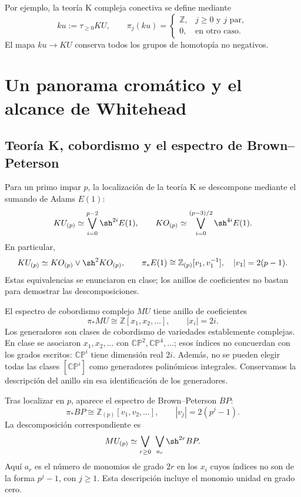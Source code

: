 Por ejemplo, la teoría K compleja conectiva se define mediante
\[
ku:=\tau_{\geq0}KU,
\qquad
\pi_j(ku)=
\begin{cases}
\mathbb Z,&j\geq0\text{ y }j\text{ par},\\
0,&\text{en otro caso}.
\end{cases}
\]
El mapa $ku\to KU$ conserva todos los grupos de homotopía no negativos.

\section{Un panorama cromático y el alcance de Whitehead}

\subsection{Teoría K, cobordismo y el espectro de Brown--Peterson}
Para un primo impar $p$, la localización de la teoría K se descompone mediante el sumando de Adams $E(1)$:
\[
KU_{(p)}\simeq\bigvee_{i=0}^{p-2}\sh^{2i}E(1),
\qquad
KO_{(p)}\simeq\bigvee_{i=0}^{(p-3)/2}\sh^{4i}E(1).
\]
En particular,
\[
KU_{(p)}\simeq KO_{(p)}\vee\sh^2KO_{(p)},
\qquad
\pi_*E(1)\cong\mathbb Z_{(p)}[v_1,v_1^{-1}],
\quad |v_1|=2(p-1).
\]
Estas equivalencias se enunciaron en clase; los anillos de coeficientes no bastan para demostrar las descomposiciones.

El espectro de cobordismo complejo $MU$ tiene anillo de coeficientes
\[
\pi_*MU\cong\mathbb Z[x_1,x_2,\ldots],
\qquad |x_i|=2i.
\]
Los generadores son clases de cobordismo de variedades establemente complejas. En clase se asociaron $x_1,x_2,\ldots$ con $\mathbb{CP}^2,\mathbb{CP}^4,\ldots$; esos índices no concuerdan con los grados escritos: $\mathbb{CP}^i$ tiene dimensión real $2i$. Además, no se pueden elegir todas las clases $[\mathbb{CP}^i]$ como generadores polinómicos integrales. Conservamos la descripción del anillo sin esa identificación de los generadores.

Tras localizar en $p$, aparece el espectro de Brown--Peterson $BP$:
\[
\pi_*BP\cong\mathbb Z_{(p)}[v_1,v_2,\ldots],
\qquad |v_j|=2(p^j-1).
\]
La descomposición correspondiente es
\[
MU_{(p)}\simeq\bigvee_{r\geq0}\ \bigvee_{a_r}\sh^{2r}BP.
\]
Aquí $a_r$ es el número de monomios de grado $2r$ en los $x_i$ cuyos índices no son de la forma $p^j-1$, con $j\geq1$. Esta descripción incluye el monomio unidad en grado cero.

